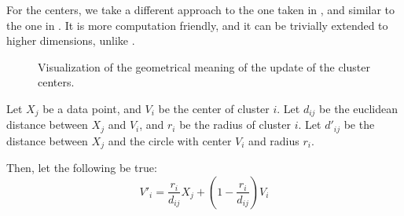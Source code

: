 \documentclass[conference]{IEEEtran}
\begin{document}
For the centers, we take a different approach to the one taken in \cite{308484}, and similar to the one in \cite{DAVE1992713}. It is more computation friendly, and it can be
trivially extended to higher dimensions, unlike \cite{308484}.

\begin{figure}[t]
\begin{center}
\end{center}
\caption{Visualization of the geometrical meaning of the update of the cluster centers.}
\end{figure}


Let $X_j$ be a data point, and $V_i$ be the center of cluster $i$. Let $d_{ij}$ be the euclidean distance between $X_j$ and $V_i$,
and $r_i$ be the radius of cluster $i$.
Let $d'_{ij}$ be the distance between $X_j$ and the circle with center $V_i$ and radius $r_i$.

Then, let the following be true:
\begin{equation}
V'_i = \frac{r_i}{d_{ij}}X_j + (1 - \frac{r_i}{d_{ij}})V_i
\end{equation}
\end{document}
